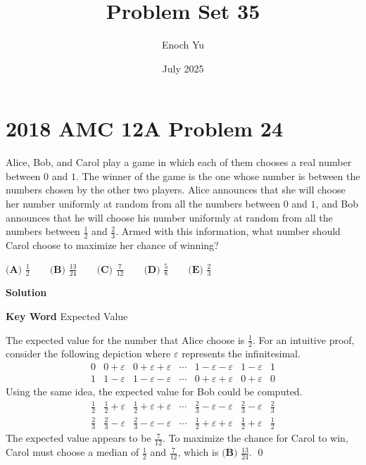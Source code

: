 \documentclass{article}
\title{Problem Set 35}
\author{Enoch Yu}
\date{July 2025}
\newenvironment{solution}{\begin{trivlist}\item[]{\bf Solution}}{\qed \end{trivlist}}
\begin{document}
\section*{2018 AMC 12A Problem 24}
Alice, Bob, and Carol play a game in which each of them chooses a real number between $0$ and $1$. The winner of the game is the one whose number is between the numbers chosen by the other two players. Alice announces that she will choose her number uniformly at random from all the numbers between $0$ and $1$, and Bob announces that he will choose his number uniformly at random from all the numbers between $\frac{1}{2}$ and $\frac{2}{3}$. Armed with this information, what number should Carol choose to maximize her chance of winning?

$\textbf{(A) }\frac{1}{2}\qquad \textbf{(B) }\frac{13}{24} \qquad \textbf{(C) }\frac{7}{12} \qquad \textbf{(D) }\frac{5}{8} \qquad \textbf{(E) }\frac{2}{3}\qquad$

\begin{solution}

\textbf{Key Word} Expected Value

The expected value for the number that Alice choose is $\frac{1}{2}$. For an intuitive proof, consider the following depiction where $\varepsilon$ represents the infinitesimal.
\[
\begin{array}{ccccccc}
    0 & 0 + \varepsilon & 0 + \varepsilon + \varepsilon & \cdots & 1 - \varepsilon - \varepsilon & 1 - \varepsilon & 1 \\
    1 & 1 - \varepsilon & 1 - \varepsilon - \varepsilon & \cdots & 0 + \varepsilon + \varepsilon & 0 + \varepsilon & 0
\end{array}
\]
Using the same idea, the expected value for Bob could be computed.
\[
\begin{array}{ccccccc}
    \frac{1}{2} & \frac{1}{2} + \varepsilon & \frac{1}{2} + \varepsilon + \varepsilon & \cdots & \frac{2}{3} - \varepsilon - \varepsilon & \frac{2}{3} - \varepsilon & \frac{2}{3} \\
    \frac{2}{3} & \frac{2}{3} - \varepsilon & \frac{2}{3} - \varepsilon - \varepsilon & \cdots & \frac{1}{2} + \varepsilon + \varepsilon & \frac{1}{2} + \varepsilon & \frac{1}{2}
\end{array}
\]
The expected value appears to be $\frac{7}{12}$. To maximize the chance for Carol to win, Carol must choose a median of $\frac{1}{2}$ and $\frac{7}{12}$, which is $\boxed{\textbf{(B) }\frac{13}{24}}$.
\end{solution}
\end{document}
